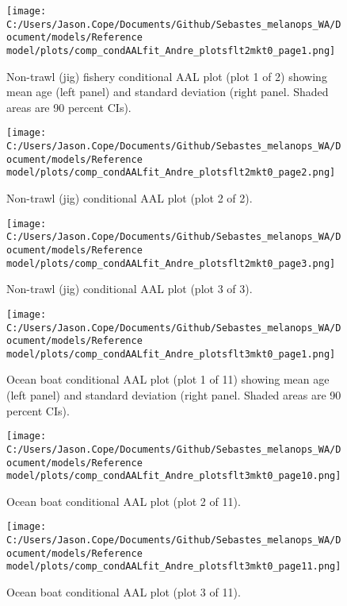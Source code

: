 \documentclass[11pt,
  english,
  letterpaper,
]{article}
\begin{document}
\begin{figure}
\centering
\texttt{[image: C:/Users/Jason.Cope/Documents/Github/Sebastes\_melanops\_WA/Document/models/Reference model/plots/comp\_condAALfit\_Andre\_plotsflt2mkt0\_page1.png]}
\caption{Non-trawl (jig) fishery conditional AAL plot (plot 1 of 2) showing mean age (left panel) and standard deviation (right panel. Shaded areas are 90 percent CIs).\label{fig:comp_condAALfit_Andre_plotsflt2mkt0_page1}}
\end{figure}

\begin{figure}
\centering
\texttt{[image: C:/Users/Jason.Cope/Documents/Github/Sebastes\_melanops\_WA/Document/models/Reference model/plots/comp\_condAALfit\_Andre\_plotsflt2mkt0\_page2.png]}
\caption{Non-trawl (jig) conditional AAL plot (plot 2 of 2).\label{fig:comp_condAALfit_Andre_plotsflt2mkt0_page2}}
\end{figure}

\begin{figure}
\centering
\texttt{[image: C:/Users/Jason.Cope/Documents/Github/Sebastes\_melanops\_WA/Document/models/Reference model/plots/comp\_condAALfit\_Andre\_plotsflt2mkt0\_page3.png]}
\caption{Non-trawl (jig) conditional AAL plot (plot 3 of 3).\label{fig:comp_condAALfit_Andre_plotsflt2mkt0_page3}}
\end{figure}

\begin{figure}
\centering
\texttt{[image: C:/Users/Jason.Cope/Documents/Github/Sebastes\_melanops\_WA/Document/models/Reference model/plots/comp\_condAALfit\_Andre\_plotsflt3mkt0\_page1.png]}
\caption{Ocean boat conditional AAL plot (plot 1 of 11) showing mean age (left panel) and standard deviation (right panel. Shaded areas are 90 percent CIs).\label{fig:comp_condAALfit_Andre_plotsflt3mkt0_page1}}
\end{figure}

\begin{figure}
\centering
\texttt{[image: C:/Users/Jason.Cope/Documents/Github/Sebastes\_melanops\_WA/Document/models/Reference model/plots/comp\_condAALfit\_Andre\_plotsflt3mkt0\_page10.png]}
\caption{Ocean boat conditional AAL plot (plot 2 of 11).\label{fig:comp_condAALfit_Andre_plotsflt3mkt0_page10}}
\end{figure}

\begin{figure}
\centering
\texttt{[image: C:/Users/Jason.Cope/Documents/Github/Sebastes\_melanops\_WA/Document/models/Reference model/plots/comp\_condAALfit\_Andre\_plotsflt3mkt0\_page11.png]}
\caption{Ocean boat conditional AAL plot (plot 3 of 11).\label{fig:comp_condAALfit_Andre_plotsflt3mkt0_page11}}
\end{figure}
\end{document}
